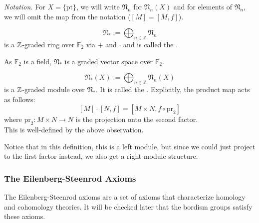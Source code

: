 \documentclass[a4paper,11pt]{article}
\begin{document}

\noindent\textit{Notation.} For \(X=\{\mathrm{pt}\}\), we will write \(\mathfrak{N}_n\) for \(\mathfrak{N}_n(X)\) and for elements of \(\mathfrak{N}_n\), we will omit the map from the notation (\([M]=[M,f]\)).

\begin{definition}\label{bordism ring}
    \[\mathfrak{N}_\ast:=\bigoplus_{n\in\mathbb{Z}}\mathfrak{N}_n\]
    is a \(\mathbb{Z}\)-graded ring over \(\mathbb{F}_2\) via \(+\) and \(\cdot\) and is called the .
\end{definition}

\begin{remark}
    As \(\mathbb{F}_2\) is a field, \(\mathfrak{N}_\ast\) is a graded vector space over \(\mathbb{F}_2\).
\end{remark}


\begin{definition}\label{bordism module}
    \[\mathfrak{N}_\ast(X):=\bigoplus_{n\in\mathbb{Z}}\mathfrak{N}_n(X)\]
    is a \(\mathbb{Z}\)-graded module over \(\mathfrak{N}_\ast\). It is called the . Explicitly, the product map acts as follows:
    \[[M]\cdot[N,f]=[M\times N, f\circ \mathrm{pr}_2]\]
    where \(\mathrm{pr}_2:M\times N\to N\) is the projection onto the second factor.\\
    This is well-defined by the above observation.
\end{definition}

\begin{remark}
    Notice that in this definition, this is a left module, but since we could just project to the first factor instead, we also get a right module structure.
\end{remark}

\subsubsection{The Eilenberg-Steenrod Axioms}\label{es axioms}\label{Kap ES}
The Eilenberg-Steenrod axioms are a set of axioms that characterize homology and cohomology theories. It will be checked later that the bordism groups satisfy these axioms.
\end{document}
